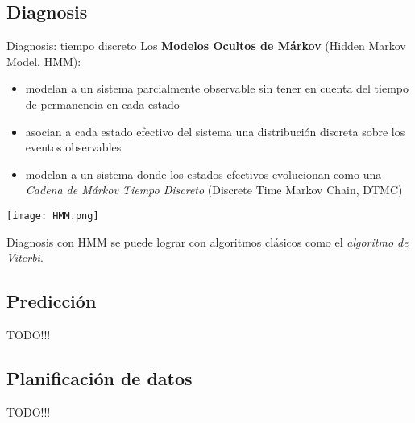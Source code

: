 \documentclass[9pt, handout]{beamer}
\begin{document}
    \subsection{Diagnosis}
      \begin{frame}{Diagnosis: tiempo discreto}
        Los \textbf{Modelos Ocultos de Márkov} (Hidden Markov Model, HMM):
        \begin{itemize}
          \item modelan a un sistema parcialmente observable sin tener en cuenta del tiempo de permanencia en cada estado
          \item asocian a cada estado efectivo del sistema una distribución discreta sobre los eventos observables
          \item modelan a un sistema donde los estados efectivos evolucionan como una \textit{Cadena de Márkov Tiempo Discreto} (Discrete Time Markov Chain, DTMC)
          
        \end{itemize}
        \begin{center}
          \texttt{[image: HMM.png]}
        \end{center}
        Diagnosis con HMM se puede lograr con algoritmos clásicos como el \textit{algoritmo de Viterbi}.
      \end{frame}
      
    \subsection{Predicción}
      \begin{frame}{TODO!!!}
      \end{frame}
      
    \subsection{Planificación de datos}
      \begin{frame}{TODO!!!}
      \end{frame}
\end{document}
